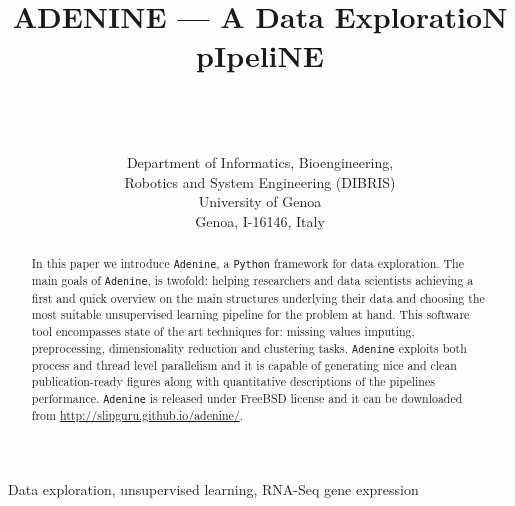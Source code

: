 \documentclass[twoside,11pt]{article}
\makeatletter
\newcommand{\ade}{\texttt{Adenine}\@\xspace}
\newcommand{\py}{\texttt{Python}\@\xspace}
\makeatother
\begin{document}
\title{ADENINE --- A Data ExploratioN pIpeliNE}

\author{ \\
 \\
 \\[1em]
\addr Department of Informatics, Bioengineering, \\Robotics and System Engineering (DIBRIS)\\
     University of Genoa\\
     Genoa, I-16146, Italy}



\maketitle

\begin{abstract}

In this paper we introduce \ade, a \py framework for data exploration. The main goals of \ade, is twofold: helping researchers and data scientists achieving a first and quick overview on the main structures underlying their data and choosing the most suitable unsupervised learning pipeline for the problem at hand. This software tool encompasses state of the art techniques for: missing values imputing, preprocessing, dimensionality reduction and clustering tasks.
\ade exploits both process and thread level parallelism and it is capable of generating nice and clean publication-ready figures along with quantitative descriptions of the pipelines performance. \ade is released under FreeBSD license and it can be downloaded from \href{http://slipguru.github.io/adenine/}{http://slipguru.github.io/adenine/}.


\end{abstract}

\begin{keywords}
Data exploration, unsupervised learning, RNA-Seq gene expression
\end{keywords}
\end{document}

